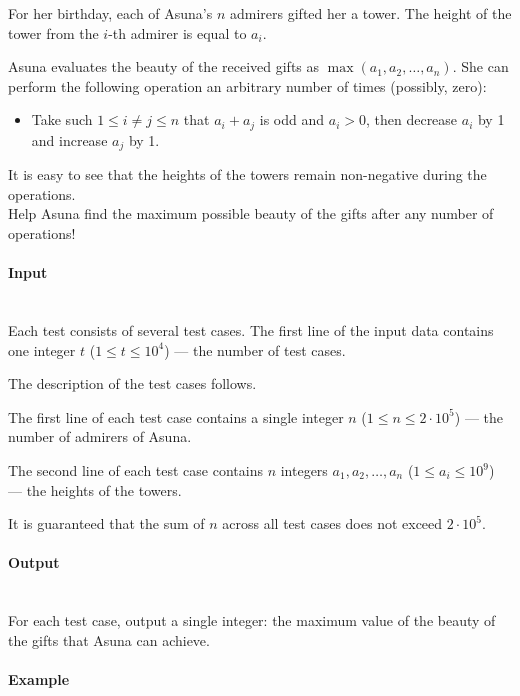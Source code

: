 \documentclass{article}
\begin{document}
For her birthday, each of Asuna's $n$ admirers gifted her a tower. The height of the tower from the $i$-th admirer is equal to $a_i$.

Asuna evaluates the beauty of the received gifts as $\max(a_1, a_2, \dots, a_n)$. She can perform the following operation an arbitrary number of times (possibly, zero):

\begin{itemize}
    \item Take such $1 \le i \ne j \le n$ that $a_i + a_j$ is odd and $a_i > 0$, then decrease $a_i$ by 1 and increase $a_j$ by 1.
\end{itemize}

It is easy to see that the heights of the towers remain non-negative during the operations. \\
Help Asuna find the maximum possible beauty of the gifts after any number of operations!

\paragraph{Input} \mbox{} \\

Each test consists of several test cases. The first line of the input data contains one integer $t$ ($1 \le t \le 10^4$) — the number of test cases.

The description of the test cases follows.

The first line of each test case contains a single integer $n$ ($1 \le n \le 2 \cdot 10^5$) — the number of admirers of Asuna.

The second line of each test case contains $n$ integers $a_1, a_2, \dots, a_n$ ($1 \le a_i \le 10^9$) — the heights of the towers.

It is guaranteed that the sum of $n$ across all test cases does not exceed $2 \cdot 10^5$.


\paragraph{Output}\mbox{} \\
For each test case, output a single integer: the maximum value of the beauty of the gifts that Asuna can achieve.


\paragraph{Example}\mbox{} \\
\end{document}
